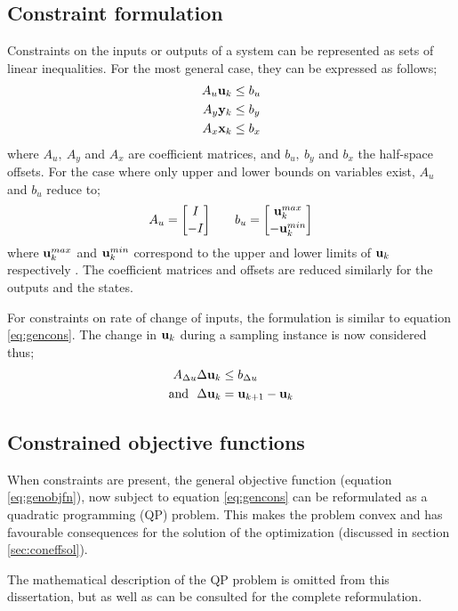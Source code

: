 \subsection{Constraint formulation}
Constraints on the inputs or outputs of a system can be represented as sets of linear inequalities.
For the most general case, they can be expressed as follows;
\begin{align}
  \label{eq:gencons}
  A_u{\bf {u}}_k &\leq b_u \notag \\
  A_y{\bf {y}}_k &\leq b_y \\
  A_x{\bf {x}}_k &\leq b_x \notag
\end{align}
where $A_u,~A_y$ and $A_x$ are coefficient matrices, and $b_u,~b_y$ and $b_x$ the half-space offsets.
For the case where only upper and lower bounds on variables exist, $A_u$ and $b_u$ reduce to;
\begin{align*}
  A_u={I\brack -I} \qquad b_u={{\bf {u}}^{max}_k \brack -{\bf {u}}^{min}_k}
\end{align*}
where ${\bf {u}}^{max}_k$ and ${\bf {u}}^{min}_k$ correspond to the upper and lower limits of ${\bf {u}}_k$ respectively \citep[6]{rawlings}. 
The coefficient matrices and offsets are reduced similarly for the outputs and the states.

For constraints on rate of change of inputs, the formulation is similar to equation \ref{eq:gencons}.
The change in ${\bf {u}}_k$ during a sampling instance is now considered thus;
\begin{align*}
  A_{\Delta u}\Delta {\bf {u}}_k &\leq b_{\Delta u} \notag \\
  \text{and}~~ \Delta {\bf {u}}_k &= {\bf {u}}_{k+1}-{\bf {u}}_k
\end{align*}

\subsection{Constrained objective functions}\label{sec:conobjfn}
When constraints are present, the general objective function (equation \ref{eq:genobjfn}), now subject to equation \ref{eq:gencons} can be reformulated as a quadratic programming (QP) problem.
This makes the problem convex and has favourable consequences for the solution of the optimization (discussed in section \ref{sec:coneffsol}).

The mathematical description of the QP problem is omitted from this dissertation, but \citet[81-83]{maciejowskimpc} as well as \citet[489-490]{rawlings} can be consulted for the complete reformulation.

